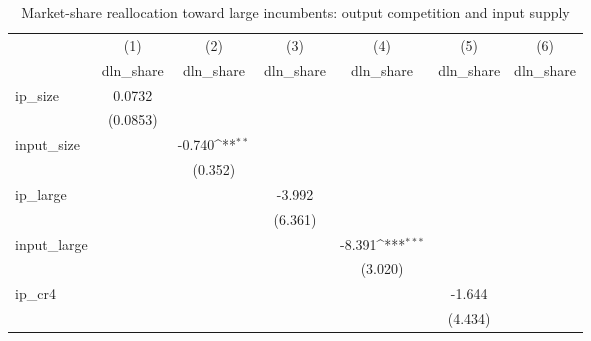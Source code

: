 \begin{table}[htbp]\centering
\def\sym#1{\ifmmode^{#1}\else\(^{#1}\)\fi}
\caption{Market-share reallocation toward large incumbents: output competition and input supply}
\begin{tabular}{l*{6}{c}}
\hline\hline
            &\multicolumn{1}{c}{(1)}&\multicolumn{1}{c}{(2)}&\multicolumn{1}{c}{(3)}&\multicolumn{1}{c}{(4)}&\multicolumn{1}{c}{(5)}&\multicolumn{1}{c}{(6)}\\
            &\multicolumn{1}{c}{dln\_share}&\multicolumn{1}{c}{dln\_share}&\multicolumn{1}{c}{dln\_share}&\multicolumn{1}{c}{dln\_share}&\multicolumn{1}{c}{dln\_share}&\multicolumn{1}{c}{dln\_share}\\
\hline
ip\_size     &      0.0732         &                     &                     &                     &                     &                     \\
            &    (0.0853)         &                     &                     &                     &                     &                     \\
[1em]
input\_size  &                     &      -0.740\sym{**} &                     &                     &                     &                     \\
            &                     &     (0.352)         &                     &                     &                     &                     \\
[1em]
ip\_large    &                     &                     &      -3.992         &                     &                     &                     \\
            &                     &                     &     (6.361)         &                     &                     &                     \\
[1em]
input\_large &                     &                     &                     &      -8.391\sym{***}&                     &                     \\
            &                     &                     &                     &     (3.020)         &                     &                     \\
[1em]
ip\_cr4      &                     &                     &                     &                     &      -1.644         &                     \\
            &                     &                     &                     &                     &     (4.434)         &                     \\

\end{tabular}
\end{table}
